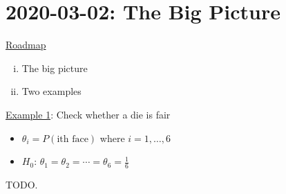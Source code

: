 \section{2020-03-02: The Big Picture}
\underline{Roadmap}
\begin{enumerate}[(i)]
    \item The big picture
    \item Two examples
\end{enumerate}
\underline{Example 1}: Check whether a die is fair
\begin{itemize}
    \item $ \theta_i=P(\text{ith face}) $ where $ i=1,\ldots ,6 $
    \item $ H_0 $: $ \theta_1=\theta_2=\cdots=\theta_6=\frac{1}{6} $
\end{itemize}
TODO.
